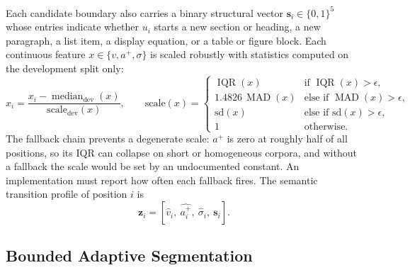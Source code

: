 \documentclass[10pt,a4paper]{article}
\DeclareMathOperator{\median}{median}
\DeclareMathOperator{\IQR}{IQR}
\DeclareMathOperator{\MAD}{MAD}
\begin{document}
Each candidate boundary also carries a binary structural vector $\mathbf{s}_i\in\{0,1\}^5$ whose entries indicate whether $u_i$ starts a new section or heading, a new paragraph, a list item, a display equation, or a table or figure block. Each continuous feature $x\in\{v,a^+,\sigma\}$ is scaled robustly with statistics computed on the development split only:
\begin{equation}
\hat x_i = \frac{x_i-\median_{\mathrm{dev}}(x)}{\mathrm{scale}_{\mathrm{dev}}(x)},\qquad
\mathrm{scale}(x)=\begin{cases}
\IQR(x) & \text{if } \IQR(x)>\epsilon,\\
1.4826\,\MAD(x) & \text{else if } \MAD(x)>\epsilon,\\
\mathrm{sd}(x) & \text{else if } \mathrm{sd}(x)>\epsilon,\\
1 & \text{otherwise.}
\end{cases}
\label{eq:normalise}
\end{equation}
The fallback chain prevents a degenerate scale: $a^+$ is zero at roughly half of all positions, so its IQR can collapse on short or homogeneous corpora, and without a fallback the scale would be set by an undocumented constant. An implementation must report how often each fallback fires. The semantic transition profile of position $i$ is
\begin{equation}
\mathbf{z}_i = \left[\hat v_i,\ \widehat{a^+_i},\ \hat\sigma_i,\ \mathbf{s}_i\right].
\label{eq:profile}
\end{equation}

\subsection{Bounded Adaptive Segmentation}
\end{document}
